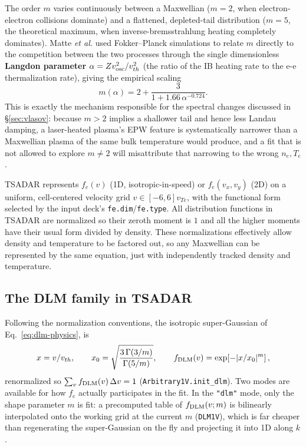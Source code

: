 \documentclass[11pt]{article}
\newcommand{\code}[1]{\texttt{#1}}
\begin{document}
The order $m$ varies continuously between a Maxwellian ($m=2$, when electron-electron collisions dominate) and a flattened,
depleted-tail distribution ($m=5$, the theoretical maximum, when inverse-bremsstrahlung
heating completely dominates). Matte \textit{et al.} used Fokker--Planck simulations to relate $m$ directly to the
competition between the two processes through the single dimensionless \textbf{Langdon
parameter} $\alpha = Zv_{\rm osc}^2/v_{th}^2$ (the ratio of the IB heating rate to the e-e thermalization rate), giving the empirical scaling 
\begin{equation}\label{eq:matte-physics}
  m(\alpha) = 2+\frac{3}{1+1.66\,\alpha^{-0.724}}.
\end{equation}
This is exactly the mechanism responsible for the spectral changes discussed in
\S\ref{sec:vlasov}: because $m>2$ implies a shallower tail and hence less Landau damping,
a laser-heated plasma's EPW feature is systematically narrower than a Maxwellian plasma of
the same bulk temperature would produce, and a fit that is not allowed to explore $m\neq2$
will misattribute that narrowing to the wrong $n_e,T_e$.

TSADAR represents $f_e(v)$ (1D, isotropic-in-speed) or $f_e(v_x,v_y)$ (2D) on a uniform,
cell-centered velocity grid $v\in[-6,6]v_{Te}$, with the functional form selected by the
input deck's \code{fe.dim}/\code{fe.type}. All distribution functions in TSADAR are normalized so their zeroth moment is $1$ and all the higher moments have their usual form divided by density. These normalizations effectively allow density and temperature to be factored out, so any Maxwellian can be represented by the same equation, just with independently tracked density and temperature.

\subsection{The DLM family in TSADAR}\label{sec:dlm}

Following the normalization conventions, the isotropic super-Gaussian of
Eq.~\ref{eq:dlm-physics}, is
\begin{equation}
  x=v/v_{th}, \qquad x_0=\sqrt{\frac{3\,\Gamma(3/m)}{\Gamma(5/m)}}, \qquad
  f_{\rm DLM}(v) = \exp\!\left[-\vert x/x_0\vert^m\right],
\end{equation}
renormalized so $\sum_v f_{\rm DLM}(v)\,\Delta v=1$ (\code{Arbitrary1V.init\_dlm}). Two
modes are available for how $f_e$ actually participates in the fit. In the
\code{"dlm"} mode, only the shape parameter $m$ is fit: a precomputed table of $f_{\rm
DLM}(v;m)$ is bilinearly interpolated onto the working grid at the current $m$
(\code{DLM1V}), which is far cheaper than regenerating the super-Gaussian on the fly and projecting it into 1D along $k$. 
\end{document}
